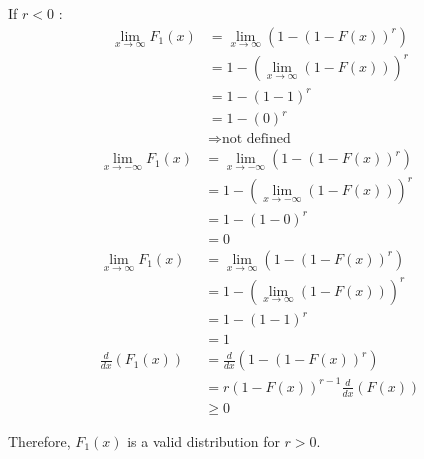\documentclass{article}
\begin{document}
If $r<0$ :
\begin{align*}
    \lim_{x\to \infty} F_1(x) &= \lim_{x\to \infty}(1-(1-F(x))^r)\\
    &= 1-\left(\lim_{x\to \infty}(1-F(x))\right)^r\\
    &= 1-(1-1)^r\\
    &= 1-(0)^r\\
    &\Rightarrow \text{not defined}
\end{align*}
\begin{align*}
    \lim_{x\to -\infty} F_1(x) &= \lim_{x\to -\infty}(1-(1-F(x))^r)\\
    &= 1-\left(\lim_{x\to -\infty}(1-F(x))\right)^r\\
    &= 1-(1-0)^r\\
    &= 0\\
   \lim_{x\to \infty} F_1(x) &= \lim_{x\to \infty}(1-(1-F(x))^r)\\
    &= 1-\left(\lim_{x\to \infty}(1-F(x))\right)^r\\
    &= 1-(1-1)^r\\
    &= 1\\
    \frac{d}{dx}(F_1(x)) &= \frac{d}{dx}(1-(1-F(x))^r)\\
    &= r(1-F(x))^{r-1}\frac{d}{dx}(F(x))\\
    &\geq 0
\end{align*}

Therefore, $F_1(x)$ is a valid distribution for $r > 0$.
\end{document}
